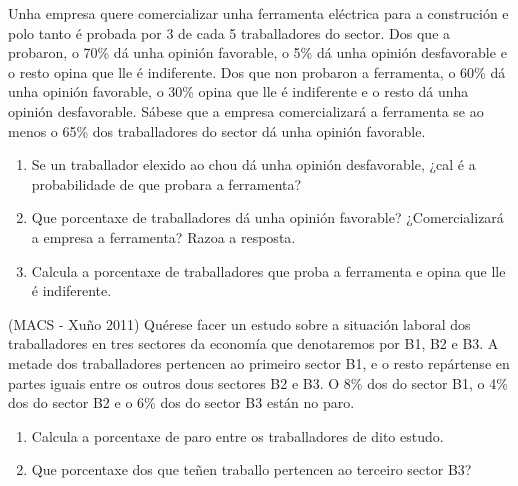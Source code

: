 \Exercicio Unha empresa quere comercializar unha ferramenta eléctrica para a construción e polo tanto é probada por 3 de cada 5 traballadores do sector. Dos que a probaron, o 70\% dá unha opinión favorable, o 5\% dá unha opinión desfavorable e o resto opina que lle é indiferente. Dos que non probaron a ferramenta, o 60\% dá unha opinión favorable, o 30\% opina que lle é indiferente e o resto dá unha opinión desfavorable. Sábese que a empresa comercializará a ferramenta se ao menos o 65\% dos traballadores do sector dá unha opinión favorable.

\begin{enumerate}[topsep=0pt,itemsep=0pt]
	\item Se un traballador elexido ao chou dá unha opinión desfavorable, ¿cal é a probabilidade de que probara a ferramenta?
	\item Que porcentaxe de traballadores dá unha opinión favorable? ¿Comercializará a empresa a ferramenta? Razoa a resposta.
	\item Calcula a porcentaxe de traballadores que proba a ferramenta e opina que lle é indiferente.
\end{enumerate}


\Exercicio  (MACS - Xuño 2011) Quérese facer un estudo sobre a situación laboral dos traballadores en tres sectores da economía que denotaremos por B1, B2 e B3. A metade dos traballadores pertencen ao primeiro sector B1, e o resto repártense en partes iguais entre os outros dous sectores B2 e B3. O 8\% dos do sector B1, o 4\% dos do sector B2 e o 6\% dos do sector B3 están no paro.

\begin{enumerate}[topsep=0pt,itemsep=0pt]
	\item Calcula a porcentaxe de paro entre os traballadores de dito estudo.
	\item Que porcentaxe dos que teñen traballo pertencen ao terceiro sector B3?
\end{enumerate}
